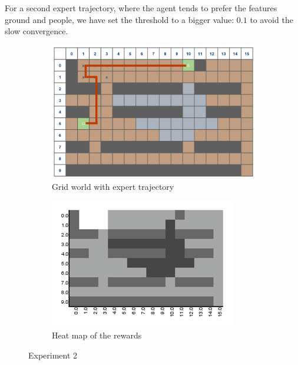 \documentclass[10pt,a4paper,twocolumn]{article}
\begin{document}
For a second expert trajectory, where the agent tends to prefer the features ground and people, we have set the threshold to a bigger value: $0.1$ to avoid the slow convergence. 

\begin{figure}[h]
\begin{subfigure}[b]{0.5\textwidth}
	\includegraphics[width=\textwidth]{experiment_2_gridworld}
	\caption{Grid world with expert trajectory}
	\label{fig:experiment2trajectory}
\end{subfigure}
\begin{subfigure}[b]{0.5\textwidth}
	\includegraphics[width=\textwidth]{experiment_2_heatmap}
	\caption{Heat map of the rewards}
	\label{fig:experiment2heatmap}
\end{subfigure}
\caption{Experiment 2}
\end{figure}
\end{document}
